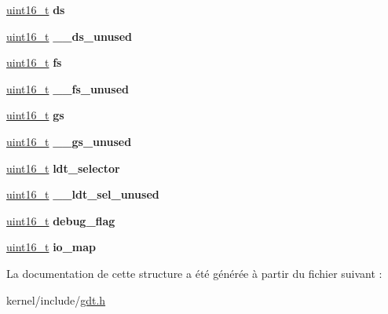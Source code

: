 \begin{DoxyCompactItemize}
\item 
\hypertarget{structtss_a61d9e6067b9aa36d03e0ddc8c0aa61ac}{\hyperlink{types_8h_adf4d876453337156dde61095e1f20223}{uint16\-\_\-t} {\bfseries ds}}\label{structtss_a61d9e6067b9aa36d03e0ddc8c0aa61ac}

\item 
\hypertarget{structtss_a004da4e1f6237ea260d9fd7b30b10d86}{\hyperlink{types_8h_adf4d876453337156dde61095e1f20223}{uint16\-\_\-t} {\bfseries \-\_\-\-\_\-ds\-\_\-unused}}\label{structtss_a004da4e1f6237ea260d9fd7b30b10d86}

\item 
\hypertarget{structtss_ac1551845bffc4e9c4f79fddb78523eb0}{\hyperlink{types_8h_adf4d876453337156dde61095e1f20223}{uint16\-\_\-t} {\bfseries fs}}\label{structtss_ac1551845bffc4e9c4f79fddb78523eb0}

\item 
\hypertarget{structtss_a6461203b734917913053143eda5e7595}{\hyperlink{types_8h_adf4d876453337156dde61095e1f20223}{uint16\-\_\-t} {\bfseries \-\_\-\-\_\-fs\-\_\-unused}}\label{structtss_a6461203b734917913053143eda5e7595}

\item 
\hypertarget{structtss_ac2889cd76d537bf35e00b0a498733209}{\hyperlink{types_8h_adf4d876453337156dde61095e1f20223}{uint16\-\_\-t} {\bfseries gs}}\label{structtss_ac2889cd76d537bf35e00b0a498733209}

\item 
\hypertarget{structtss_a0164550a474dc0918057cea651116728}{\hyperlink{types_8h_adf4d876453337156dde61095e1f20223}{uint16\-\_\-t} {\bfseries \-\_\-\-\_\-gs\-\_\-unused}}\label{structtss_a0164550a474dc0918057cea651116728}

\item 
\hypertarget{structtss_a934b41d2a63e759757d3afa0fab227c1}{\hyperlink{types_8h_adf4d876453337156dde61095e1f20223}{uint16\-\_\-t} {\bfseries ldt\-\_\-selector}}\label{structtss_a934b41d2a63e759757d3afa0fab227c1}

\item 
\hypertarget{structtss_a927509e57cfd273e377cec7368aedb50}{\hyperlink{types_8h_adf4d876453337156dde61095e1f20223}{uint16\-\_\-t} {\bfseries \-\_\-\-\_\-ldt\-\_\-sel\-\_\-unused}}\label{structtss_a927509e57cfd273e377cec7368aedb50}

\item 
\hypertarget{structtss_acfac9fc24de46f84d90c08d1b9b439e3}{\hyperlink{types_8h_adf4d876453337156dde61095e1f20223}{uint16\-\_\-t} {\bfseries debug\-\_\-flag}}\label{structtss_acfac9fc24de46f84d90c08d1b9b439e3}

\item 
\hypertarget{structtss_a25381c4288df77c8ab283299a1a288e8}{\hyperlink{types_8h_adf4d876453337156dde61095e1f20223}{uint16\-\_\-t} {\bfseries io\-\_\-map}}\label{structtss_a25381c4288df77c8ab283299a1a288e8}

\end{DoxyCompactItemize}


\-La documentation de cette structure a été générée à partir du fichier suivant \-:\begin{DoxyCompactItemize}
\item 
kernel/include/\hyperlink{gdt_8h}{gdt.\-h}\end{DoxyCompactItemize}
